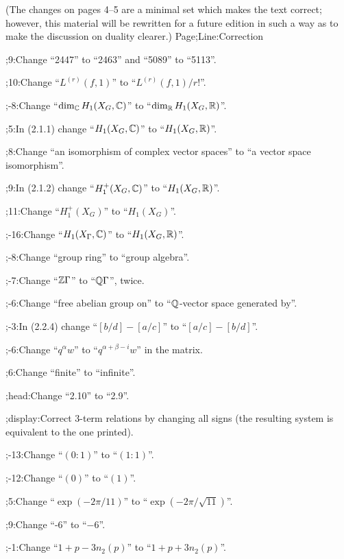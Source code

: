 (The changes on pages 4--5 are a minimal set which makes the text
correct; however, this material will be rewritten for a future edition
in such a way as to make the discussion on duality clearer.)
\smallskip
\err Page;\hbox{Line}:Correction\par
%
%
;9:Change ``2447'' to ``2463'' and ``5089'' to ``5113''.\par
{};10:Change ``$L^{(r)}(f,1)$'' to ``$L^{(r)}(f,1)/r!$''.\par
%
%
;-8:Change ``$\dim_{{\Bbb C}}H_1(X_G,{\Bbb C})$'' to ``$\dim_{{\Bbb R}}H_1(X_G,{\Bbb R})$''.\par
{};5:In (2.1.1) change ``$H_1(X_G,{\Bbb C})$'' to ``$H_1(X_G,{\Bbb R})$''.\par
{};8:Change ``an isomorphism of complex vector spaces'' to ``a vector
space isomorphism''.\par
{};9:In (2.1.2) change ``$H_1^+(X_G,{\Bbb C})$'' to ``$H_1(X_G,{\Bbb R})$''.\par
{};11:Change ``$H_1^+(X_G)$'' to ``$H_1(X_G)$''.\par
{};-16:Change ``$H_1(X_\Gamma,{\Bbb C})$'' to ``$H_1(X_G,{\Bbb R})$''.\par
{};-8:Change ``group ring'' to ``group algebra''.\par
{};-7:Change ``${\Bbb Z}\Gamma$'' to ``${\Bbb Q}\Gamma$'', twice.\par
{};-6:Change ``free abelian group on'' to ``${\Bbb Q}$-vector space generated 
by''.\par 
{};-3:In (2.2.4) change ``$[b/d]-[a/c]$'' to ``$[a/c]-[b/d]$''.\par
{};-6:Change ``$q^{\alpha}w$'' to ``$q^{\alpha+\beta-i}w$'' in the matrix.\par
{};6:Change ``finite'' to ``infinite''.\par
{};\hbox{head}:Change ``2.10'' to ``2.9''.\par
%
%
;\hbox{display}:Correct 3-term relations by changing all signs
 (the resulting system is equivalent to the one printed).\par
{};-13:Change ``$(0:1)$'' to ``$(1:1)$''.\par
{};-12:Change ``$(0)$'' to ``$(1)$''.\par
{};5:Change ``$\exp(-2\pi/11)$'' to ``$\exp(-2\pi/\sqrt{11})$''.\par
{};9:Change ``-6'' to ``$-6$''.\par
{};-1:Change ``$1+p-3n_2(p)$'' to ``$1+p+3n_2(p)$''.\par
